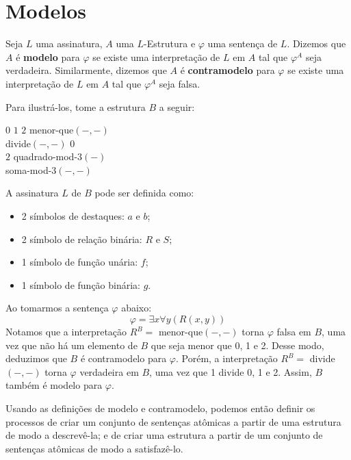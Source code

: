 \section{Modelos}

Seja $L$ uma assinatura, $A$ uma $L$-Estrutura e $\varphi$ uma sentença de $L$. Dizemos que $A$ é \textbf{modelo} para $\varphi$ se existe uma interpretação de $L$ em $A$ tal que $\varphi^A$ seja verdadeira. Similarmente, dizemos que $A$ é \textbf{contramodelo} para $\varphi$ se existe uma interpretação de $L$ em $A$ tal que $\varphi^A$ seja falsa.

Para ilustrá-los, tome a estrutura $B$ a seguir:
\begin{center}
    \begin{structure}
        {}
        {$0$ $1$ $2$}
        {menor-que$(-,-)$\\divide$(-,-)$}
        {$0$\\$2$}
        {quadrado-mod-3$(-)$\\soma-mod-3$(-,-)$}
    \end{structure}
\end{center}

A assinatura $L$ de $B$ pode ser definida como:
\begin{itemize}
    \item 2 símbolos de destaques: $a$ e $b$;
    \item 2 símbolo de relação binária: $R$ e $S$;
    \item 1 símbolo de função unária: $f$;
    \item 1 símbolo de função binária: $g$.
\end{itemize}
Ao tomarmos a sentença $\varphi$ abaixo:
\[\varphi = \exists x\forall y(R(x,y))\]
Notamos que a interpretação $R^B =$ menor-que$(-,-)$ torna $\varphi$ falsa em $B$, uma vez que não há um elemento de $B$ que seja menor que 0, 1 e 2. Desse modo, deduzimos que $B$ é contramodelo para $\varphi$. Porém, a interpretação $R^B =$ divide$(-,-)$ torna $\varphi$ verdadeira em $B$, uma vez que 1 divide 0, 1 e 2. Assim, $B$ também é modelo para $\varphi$.

Usando as definições de modelo e contramodelo, podemos então definir os processos de criar um conjunto de sentenças atômicas a partir de uma estrutura de modo a descrevê-la; e de criar uma estrutura a partir de um conjunto de sentenças atômicas de modo a satisfazê-lo. 

